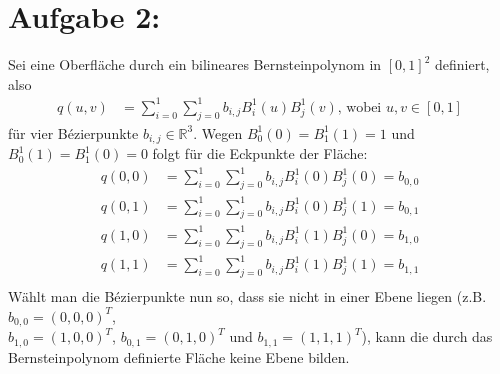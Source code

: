 \section*{Aufgabe 2: }
Sei eine Oberfläche durch ein bilineares Bernsteinpolynom in $[0,1]^2$ definiert, also
\begin{align*}
  q(u,v) &= \sum_{i=0}^1\sum_{j=0}^1b_{i,j}B^1_i(u)B^1_j(v)\text{, wobei $u, v\in [0,1]$}
\end{align*}
für vier Bézierpunkte $b_{i,j} \in \mathbb{R}^3$. Wegen $B^1_0(0) = B^1_1(1) = 1$ und $B^1_0(1) = B^1_1(0) = 0$ folgt für die Eckpunkte der Fläche:
\begin{align*}
  q(0,0) &= \sum_{i=0}^1\sum_{j=0}^1b_{i,j}B^1_i(0)B^1_j(0) = b_{0,0}\\
  q(0,1) &= \sum_{i=0}^1\sum_{j=0}^1b_{i,j}B^1_i(0)B^1_j(1) = b_{0,1}\\
  q(1,0) &= \sum_{i=0}^1\sum_{j=0}^1b_{i,j}B^1_i(1)B^1_j(0) = b_{1,0}\\
  q(1,1) &= \sum_{i=0}^1\sum_{j=0}^1b_{i,j}B^1_i(1)B^1_j(1) = b_{1,1}\\
\end{align*}
Wählt man die Bézierpunkte nun so, dass sie nicht in einer Ebene liegen (z.B. \hbox{$b_{0,0} = (0,0,0)^T$}, \\\hbox{$b_{1,0} = (1,0,0)^T$}, \hbox{$b_{0,1} = (0, 1, 0)^T$} und \hbox{$b_{1,1} = (1, 1, 1)^T$}), kann die durch das Bernsteinpolynom definierte Fläche keine Ebene bilden.
